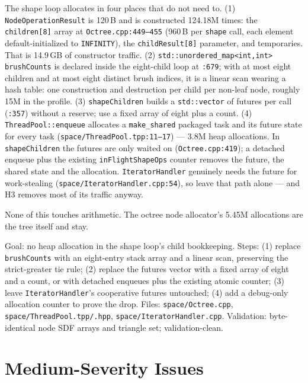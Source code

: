 \documentclass[11pt,a4paper]{article}
\begin{document}
The shape loop allocates in four places that do not need to. (1)
\texttt{NodeOperationResult} is 120\,B and is constructed 124.18M times: the
\texttt{children[8]} array at \texttt{Octree.cpp:449--455} (960\,B per
\texttt{shape} call, each element default-initialized to \texttt{INFINITY}),
the \texttt{childResult[8]} parameter, and temporaries. That is 14.9\,GB of
constructor traffic. (2) \texttt{std::unordered\_map<int,int> brushCounts}
is declared inside the eight-child loop at \texttt{:679}; with at most eight
children and at most eight distinct brush indices, it is a linear scan
wearing a hash table: one construction and destruction per child per
non-leaf node, roughly 15M in the profile. (3) \texttt{shapeChildren} builds a
\texttt{std::vector} of futures per call (\texttt{:357}) without a reserve;
use a fixed array of eight plus a count. (4) \texttt{ThreadPool::enqueue}
allocates a \texttt{make\_shared} packaged task and its future state for
every task (\texttt{space/ThreadPool.tpp:11--17}) --- 3.8M heap allocations.
In \texttt{shapeChildren} the futures are only waited on
(\texttt{Octree.cpp:419}); a detached enqueue plus the existing
\texttt{inFlightShapeOps} counter removes the future, the shared state and
the allocation. \texttt{IteratorHandler} genuinely needs the future for
work-stealing (\texttt{space/IteratorHandler.cpp:54}), so leave that path
alone --- and H3 removes most of its traffic anyway.

None of this touches arithmetic. The octree node allocator's 5.45M
allocations are the tree itself and stay.

\begin{tcolorbox}[promptbox={Prompt --- H4: remove per-node allocation churn}]
Goal: no heap allocation in the shape loop's child bookkeeping. Steps:
(1) replace \texttt{brushCounts} with an eight-entry stack array and a linear
scan, preserving the strict-greater tie rule; (2) replace the futures vector
with a fixed array of eight and a count, or with detached enqueues plus the
existing atomic counter; (3) leave \texttt{IteratorHandler}'s cooperative
futures untouched; (4) add a debug-only allocation counter to prove the drop.
Files: \texttt{space/Octree.cpp}, \texttt{space/ThreadPool.tpp/.hpp},
\texttt{space/IteratorHandler.cpp}. Validation: byte-identical node SDF
arrays and triangle set; validation-clean.
\end{tcolorbox}

\section{Medium-Severity Issues}
\end{document}
